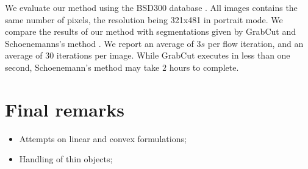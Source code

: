 \documentclass[runningheads]{llncs}
\begin{document}
\begin{figure}
	\center
	\subfloat{

	}%
\end{figure}

We evaluate our method using the BSD300 database \cite{martinFTM01berkeley}. All images contains the same number of pixels, the resolution being 321x481 in portrait mode. We compare the results of our method with segmentations given by GrabCut and Schoenemanns's method \cite{schoenemann09linear}. We report an average of $3s$ per flow iteration, and an average of $30$ iterations per image. While GrabCut executes in less than one second, Schoenemann's method may take $2$ hours to complete.

\section{Final remarks}\label{sec:final-remarks}

\begin{itemize}
    \item{Attempts on linear and convex formulations; }
    \item{Handling of thin objects;  }
\end{itemize}

%
%
%


\end{document}
